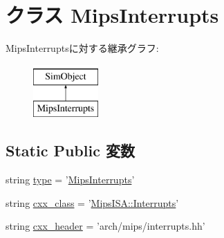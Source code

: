 \hypertarget{classMipsInterrupts_1_1MipsInterrupts}{
\section{クラス MipsInterrupts}
\label{classMipsInterrupts_1_1MipsInterrupts}
}
MipsInterruptsに対する継承グラフ:\begin{figure}[H]
\begin{center}
\leavevmode
\includegraphics[height=2cm]{classMipsInterrupts_1_1MipsInterrupts}
\end{center}
\end{figure}
\subsection*{Static Public 変数}
\begin{DoxyCompactItemize}
\item 
string \hyperlink{classMipsInterrupts_1_1MipsInterrupts_acce15679d830831b0bbe8ebc2a60b2ca}{type} = '\hyperlink{classMipsInterrupts_1_1MipsInterrupts}{MipsInterrupts}'
\item 
string \hyperlink{classMipsInterrupts_1_1MipsInterrupts_a58cd55cd4023648e138237cfc0822ae3}{cxx\_\-class} = '\hyperlink{classMipsISA_1_1Interrupts}{MipsISA::Interrupts}'
\item 
string \hyperlink{classMipsInterrupts_1_1MipsInterrupts_a17da7064bc5c518791f0c891eff05fda}{cxx\_\-header} = 'arch/mips/interrupts.hh'
\end{DoxyCompactItemize}


